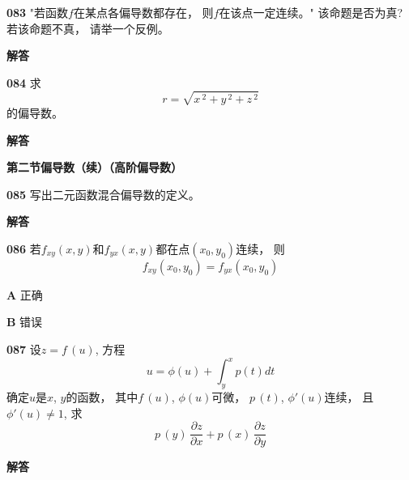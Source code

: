 \documentclass[a4paper,10pt]{article} %
\begin{document}
\newpage
\par\noindent \textbf{083} \quad "若函数$f$在某点各偏导数都存在， 则$f$在该点一定连续。" 该命题是否为真? 若该命题不真， 
请举一个反例。
\par\noindent \textbf{ 解答}





\textheight


\par\noindent \textbf{084} \quad 求
$$r=\sqrt{x\,^2+y\,^2+z\,^2}$$
的偏导数。
\par\noindent \textbf{ 解答}





\textheight


\newpage
\par\noindent \textbf{第二节\quad 偏导数（续）（高阶偏导数）}
\par\noindent \textbf{085} \quad 写出二元函数混合偏导数的定义。
\par\noindent \textbf{ 解答}





\textheight


\par\noindent \textbf{086} \quad 若$f_{xy}(x,y)$和$f_{yx}(x,y)$都在点$(x_0,y_0)$连续， 则
$$f_{xy}(x_0,y_0) = f_{yx}(x_0,y_0)$$
\par\noindent \textbf{A} \quad 正确
\par\noindent \textbf{B} \quad 错误





\textheight


\par\noindent \textbf{087} \quad 设$z=f\,(u)$, 方程
$$u=\phi(u)+\int_y^x p(t)dt$$
确定$u$是$x$, $y$的函数， 其中$f\,(u)$, $\phi(u)$可微， $p\,(t)$, $\phi'(u)$连续， 
且$\phi'(u)\neq 1$, 求
$$p\,(y)\,\frac{\partial z}{\partial x} + p\,(x)\,\frac{\partial z}{\partial y}$$
\par\noindent \textbf{ 解答}
\end{document}
